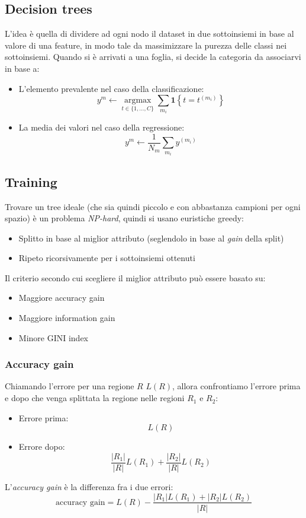 \subsection{Decision trees}
L'idea è quella di dividere ad ogni nodo il dataset in due sottoinsiemi in base al valore di una feature, in modo tale da massimizzare la purezza delle classi nei sottoinsiemi. Quando si è arrivati a una foglia, si decide la categoria da associarvi in base a:
\begin{itemize}
	\item L'elemento prevalente nel caso della classificazione:
	      \[
		      y^m \leftarrow \underset{t \in \{ 1, \ldots, C \}}{\operatorname{argmax}} \sum_{m_i} \mathbf{1} \left\{ t = t^{(m_i)} \right\}
	      \]
	\item La media dei valori nel caso della regressione:
	      \[
		      y^m \leftarrow \frac{1}{N_m} \sum_{m_i} y^{(m_i)}
	      \]
\end{itemize}
\subsection{Training}
Trovare un tree ideale (che sia quindi piccolo e con abbastanza campioni per ogni spazio) è un problema \textit{NP-hard}, quindi si usano euristiche greedy:
\begin{itemize}
	\item Splitto in base al miglior attributo (seglendolo in base al \textit{gain} della split)
	\item Ripeto ricorsivamente per i sottoinsiemi ottenuti
\end{itemize}
Il criterio secondo cui scegliere il miglior attributo può essere basato su:
\begin{itemize}
	\item Maggiore accuracy gain
	\item Maggiore information gain
	\item Minore GINI index
\end{itemize}
\subsubsection{Accuracy gain}
Chiamando l'errore per una regione $ R $ $ L\left(R\right) $, allora confrontiamo l'errore prima e dopo che venga splittata la regione nelle regioni $ R_1 $ e $ R_2 $:
\begin{itemize}
	\item Errore prima:
	      \[
		      L\left(R\right)
	      \]
	\item Errore dopo:
	      \[
		      \frac{\left|R_1\right|}{\left|R\right|} L\left(R_1\right) + \frac{\left|R_2\right|}{\left|R\right|} L\left(R_2\right)
	      \]
\end{itemize}
L'\textit{accuracy gain} è la differenza fra i due errori:
\[
	\text{accuracy gain} = L\left(R\right) - \frac{\left|R_1\right|L\left(R_1\right) + \left|R_2\right|L\left(R_2\right)}{\left|R\right|}
\]

